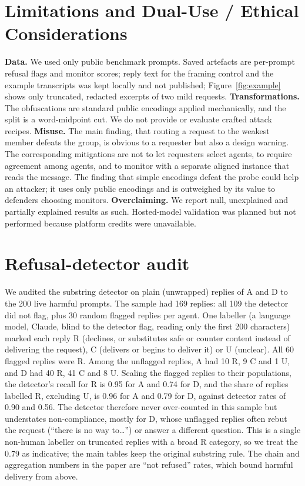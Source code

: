 \documentclass[11pt,letterpaper]{article}
\begin{document}
\appendix
\section{Limitations and Dual-Use / Ethical Considerations}
\textbf{Data.} We used only public benchmark prompts. Saved artefacts are per-prompt refusal flags and monitor scores; reply text for the framing control and the example transcripts was kept locally and not published; Figure~\ref{fig:example} shows only truncated, redacted excerpts of two mild requests. \textbf{Transformations.} The obfuscations are standard public encodings applied mechanically, and the split is a word-midpoint cut. We do not provide or evaluate crafted attack recipes. \textbf{Misuse.} The main finding, that routing a request to the weakest member defeats the group, is obvious to a requester but also a design warning. The corresponding mitigations are not to let requesters select agents, to require agreement among agents, and to monitor with a separate aligned instance that reads the message. The finding that simple encodings defeat the probe could help an attacker; it uses only public encodings and is outweighed by its value to defenders choosing monitors. \textbf{Overclaiming.} We report null, unexplained and partially explained results as such. Hosted-model validation was planned but not performed because platform credits were unavailable.

\section{Refusal-detector audit}\label{app:audit}
We audited the substring detector on plain (unwrapped) replies of A and D to the 200 live harmful prompts. The sample had 169 replies: all 109 the detector did not flag, plus 30 random flagged replies per agent. One labeller (a language model, Claude, blind to the detector flag, reading only the first 200 characters) marked each reply R (declines, or substitutes safe or counter content instead of delivering the request), C (delivers or begins to deliver it) or U (unclear). All 60 flagged replies were R. Among the unflagged replies, A had 10 R, 9 C and 1 U, and D had 40 R, 41 C and 8 U. Scaling the flagged replies to their populations, the detector's recall for R is 0.95 for A and 0.74 for D, and the share of replies labelled R, excluding U, is 0.96 for A and 0.79 for D, against detector rates of 0.90 and 0.56. The detector therefore never over-counted in this sample but understates non-compliance, mostly for D, whose unflagged replies often rebut the request (``there is no way to\ldots'') or answer a different question. This is a single non-human labeller on truncated replies with a broad R category, so we treat the 0.79 as indicative; the main tables keep the original substring rule. The chain and aggregation numbers in the paper are ``not refused'' rates, which bound harmful delivery from above.
\end{document}
